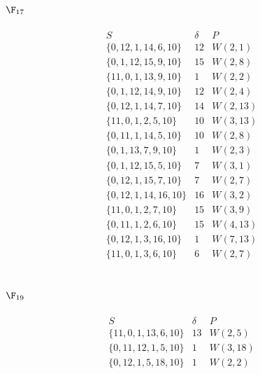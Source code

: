 \subsection*{\(\F_{17}\)}
\[
\begin{array}{c|c|c}
S&\delta&P\\ \hline
\{0,12,1,14,6,10\}&12&W(2,1)\\
\{0,1,12,15,9,10\}&15&W(2,8)\\
\{11,0,1,13,9,10\}&1&W(2,2)\\
\{0,1,12,14,9,10\}&12&W(2,4)\\
\{0,12,1,14,7,10\}&14&W(2,13)\\
\{11,0,1,2,5,10\}&10&W(3,13)\\
\{0,11,1,14,5,10\}&10&W(2,8)\\
\{0,1,13,7,9,10\}&1&W(2,3)\\
\{0,1,12,15,5,10\}&7&W(3,1)\\
\{0,12,1,15,7,10\}&7&W(2,7)\\
\{0,12,1,14,16,10\}&16&W(3,2)\\
\{11,0,1,2,7,10\}&15&W(3,9)\\
\{0,11,1,2,6,10\}&15&W(4,13)\\
\{0,12,1,3,16,10\}&1&W(7,13)\\
\{11,0,1,3,6,10\}&6&W(2,7)
\end{array}
\]

\subsection*{\(\F_{19}\)}
\[
\begin{array}{c|c|c}
S&\delta&P\\ \hline
\{11,0,1,13,6,10\}&13&W(2,5)\\
\{0,11,12,1,5,10\}&1&W(3,18)\\
\{0,12,1,5,18,10\}&1&W(2,2)
\end{array}
\]
